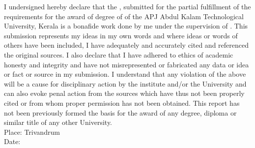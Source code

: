 
I undersigned hereby declare that the \reportnames{} \projectname{} 
, submitted for the partial fulfillment of the requirements for the award of degree of \degree{} of the APJ Abdul Kalam Technological University, Kerala is a bonafide work done by me under the supervision of \guide{}. This submission represents my ideas in my own words and where ideas or words of others have been included, I have adequately and accurately cited and referenced the original sources. I also declare that I have adhered to ethics of academic honesty and integrity and have not misrepresented or fabricated any data or idea or fact or source in my submission. I understand that any violation of the above will be a cause for disciplinary action by the institute and/or the University and can also evoke penal action from the sources which have thus not been properly cited or from whom proper permission has not been obtained. This report has not been previously formed the basis for the award of any degree, diploma or similar title of any other University. 
\vspace{20mm}
\\Place: Trivandrum								
\\Date:      \hfill     \stud{} 
